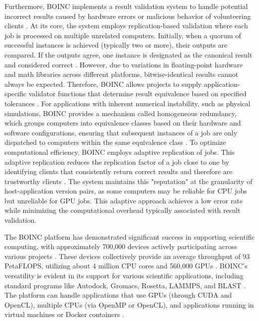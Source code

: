 Furthermore, \ac{BOINC} implements a result validation system to handle potential incorrect results caused by hardware errors or malicious behavior of volunteering clients \cite{relatedwork:boinc1}. At its core, the system employs replication-based validation where each job is processed on multiple unrelated computers. Initially, when a quorum of successful instances is achieved (typically two or more), their outputs are compared. If the outputs agree, one instance is designated as the canonical result and considered correct \cite{relatedwork:boinc1}. However, due to variations in floating-point hardware and math libraries across different platforms, bitwise-identical results cannot always be expected. Therefore, \ac{BOINC} allows projects to supply application-specific validator functions that determine result equivalence based on specified tolerances \cite{relatedwork:boinc1}. For applications with inherent numerical instability, such as physical simulations, \ac{BOINC} provides a mechanism called homogeneous redundancy, which groups computers into equivalence classes based on their hardware and software configurations, ensuring that subsequent instances of a job are only dispatched to computers within the same equivalence class \cite{relatedwork:boinc1}. To optimize computational efficiency, \ac{BOINC} employs adaptive replication of jobs. This adaptive replication reduces the replication factor of a job close to one by identifying clients that consistently return correct results and therefore are trustworthy clients \cite{relatedwork:boinc1}. The system maintains this "reputation" at the granularity of host-application version pairs, as some computers may be reliable for \acs{CPU} jobs but unreliable for \acs{GPU} jobs. This adaptive approach achieves a low error rate while minimizing the computational overhead typically associated with result validation.

The \ac{BOINC} platform has demonstrated significant success in supporting scientific computing, with approximately 700,000 devices actively participating across various projects \cite{relatedwork:boinc1}. These devices collectively provide an average throughput of 93 Peta\ac{FLOPS}, utilizing about 4 million \acs{CPU} cores and 560,000 \acs{GPU}s \cite{relatedwork:boinc1}. \ac{BOINC}'s versatility is evident in its support for various scientific applications, including standard programs like Autodock, Gromacs, Rosetta, LAMMPS, and BLAST \cite{relatedwork:boinc1}. The platform can handle applications that use \acs{GPU}s (through CUDA and OpenCL), multiple \acs{CPU}s (via OpenMP or OpenCL), and applications running in virtual machines or Docker containers \cite{relatedwork:boinc1}.

